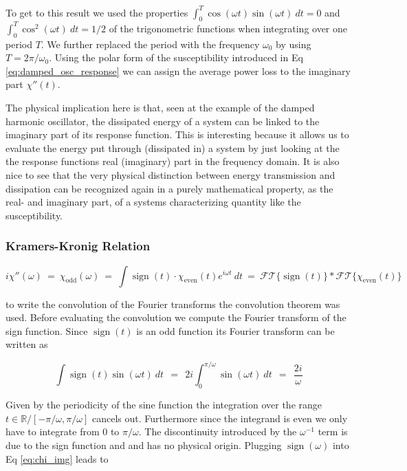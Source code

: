 \documentclass[10pt]{report}
\numberwithin{equation}{chapter}
\newcommand{\refEq}[1]{
  Eq  \ref{#1}
}
\DeclareMathOperator{\sign}{sign}
\newcommand{\FT}[1]{	%
  \mathcal{FT}\{ #1 \}
}
\begin{document}
To get to this result we used  the properties $\int_0^T \cos(\omega t) \sin(\omega t)\ dt = 0$ and $\int_0^T \cos^2(\omega t)\ dt = 1/2$ of the trigonometric functions when integrating over one period $T$. We further replaced the period with the frequency $\omega_0$ by using $T=2\pi /\omega_0$.
Using the polar form of the susceptibility introduced in \refEq{eq:damped_osc_response} we can assign the average power loss to the imaginary part $\chi''(t)$.

The physical implication here is that, seen at the example of the damped harmonic oscillator, the dissipated energy of a system can be linked to the imaginary part of its response function.
This is interesting because it allows us to evaluate the energy put through (dissipated in) a system by just looking at the the response functions real (imaginary) part in the frequency domain. 
It is also nice to see that the very physical distinction between energy transmission and dissipation can be recognized again in a purely mathematical property, as the real- and imaginary part, of a systems characterizing quantity like the susceptibility.


\subsubsection{Kramers-Kronig Relation}

\begin{equation} \label{eq:chi_img}
  i \chi''(\omega) ~=~ \chi_\text{odd}(\omega) ~=~ \int \sign(t) \cdot \chi_\text{even}(t) e^{i\omega t}\ dt ~=~ \FT{\sign(t)} \ast \FT{\chi_\text{even}(t)}
\end{equation}

to write the convolution of the Fourier transforms the convolution theorem was used. Before evaluating the convolution we compute the Fourier transform of the sign function. Since $\sign(t)$ is an odd function its Fourier transform can be written as

\begin{equation}
  \int \sign(t) \sin(\omega t)\ dt ~~=~~ 2i \int^{\pi/ \omega}_0 \sin(\omega t)\ dt ~~=~~ \frac{2i}{\omega}
\end{equation}

Given by the periodicity of the sine function the integration over the range $t \in \mathbb{R}/[-\pi/\omega, \pi/\omega]$  cancels out. Furthermore since the integrand is even we only have to integrate from $0$ to $\pi/\omega$. 
The discontinuity introduced by the $\omega^{-1}$ term is due to the sign function and and has no physical origin. Plugging $\sign(\omega)$ into \refEq{eq:chi_img} leads to
\end{document}
